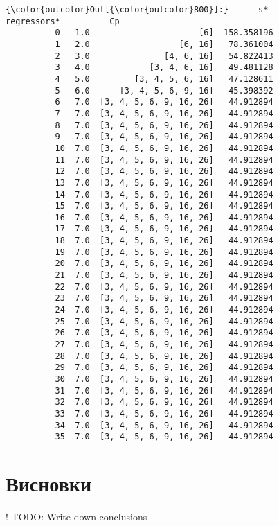 \documentclass[11pt]{article}
\begin{document}
\begin{Verbatim}[commandchars=\\\{\}]
{\color{outcolor}Out[{\color{outcolor}800}]:}      s*              regressors*          Cp
          0   1.0                      [6]  158.358196
          1   2.0                  [6, 16]   78.361004
          2   3.0               [4, 6, 16]   54.822413
          3   4.0            [3, 4, 6, 16]   49.481128
          4   5.0         [3, 4, 5, 6, 16]   47.128611
          5   6.0      [3, 4, 5, 6, 9, 16]   45.398392
          6   7.0  [3, 4, 5, 6, 9, 16, 26]   44.912894
          7   7.0  [3, 4, 5, 6, 9, 16, 26]   44.912894
          8   7.0  [3, 4, 5, 6, 9, 16, 26]   44.912894
          9   7.0  [3, 4, 5, 6, 9, 16, 26]   44.912894
          10  7.0  [3, 4, 5, 6, 9, 16, 26]   44.912894
          11  7.0  [3, 4, 5, 6, 9, 16, 26]   44.912894
          12  7.0  [3, 4, 5, 6, 9, 16, 26]   44.912894
          13  7.0  [3, 4, 5, 6, 9, 16, 26]   44.912894
          14  7.0  [3, 4, 5, 6, 9, 16, 26]   44.912894
          15  7.0  [3, 4, 5, 6, 9, 16, 26]   44.912894
          16  7.0  [3, 4, 5, 6, 9, 16, 26]   44.912894
          17  7.0  [3, 4, 5, 6, 9, 16, 26]   44.912894
          18  7.0  [3, 4, 5, 6, 9, 16, 26]   44.912894
          19  7.0  [3, 4, 5, 6, 9, 16, 26]   44.912894
          20  7.0  [3, 4, 5, 6, 9, 16, 26]   44.912894
          21  7.0  [3, 4, 5, 6, 9, 16, 26]   44.912894
          22  7.0  [3, 4, 5, 6, 9, 16, 26]   44.912894
          23  7.0  [3, 4, 5, 6, 9, 16, 26]   44.912894
          24  7.0  [3, 4, 5, 6, 9, 16, 26]   44.912894
          25  7.0  [3, 4, 5, 6, 9, 16, 26]   44.912894
          26  7.0  [3, 4, 5, 6, 9, 16, 26]   44.912894
          27  7.0  [3, 4, 5, 6, 9, 16, 26]   44.912894
          28  7.0  [3, 4, 5, 6, 9, 16, 26]   44.912894
          29  7.0  [3, 4, 5, 6, 9, 16, 26]   44.912894
          30  7.0  [3, 4, 5, 6, 9, 16, 26]   44.912894
          31  7.0  [3, 4, 5, 6, 9, 16, 26]   44.912894
          32  7.0  [3, 4, 5, 6, 9, 16, 26]   44.912894
          33  7.0  [3, 4, 5, 6, 9, 16, 26]   44.912894
          34  7.0  [3, 4, 5, 6, 9, 16, 26]   44.912894
          35  7.0  [3, 4, 5, 6, 9, 16, 26]   44.912894
\end{Verbatim}
            
    \section{Висновки}\label{ux432ux438ux441ux43dux43eux432ux43aux438}

    ! TODO: Write down conclusions
\end{document}
